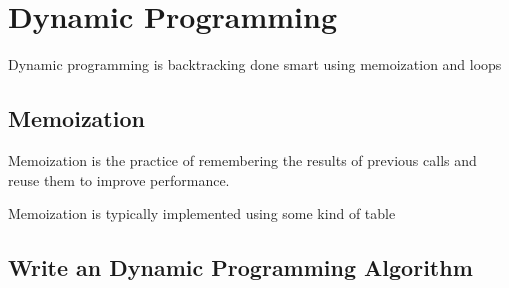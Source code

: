 \chapter{Dynamic Programming}

Dynamic programming is backtracking done smart using memoization and loops

\section{Memoization}

  Memoization is the practice of remembering the results of previous
   calls and reuse them to improve performance.

  Memoization is typically implemented using some kind of table

\section{Write an Dynamic Programming Algorithm}

